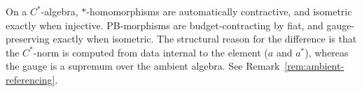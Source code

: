 \begin{remark}
On a $C^*$-algebra, $*$-homomorphisms are automatically contractive, and
isometric exactly when injective.  PB-morphisms are budget-contracting by fiat,
and gauge-preserving exactly when isometric.  The structural reason for the
difference is that the $C^*$-norm is computed from data internal to the element
($a$ and $a^*$), whereas the gauge is a supremum over the ambient algebra.  See
Remark~\ref{rem:ambient-referencing}.
\end{remark}
